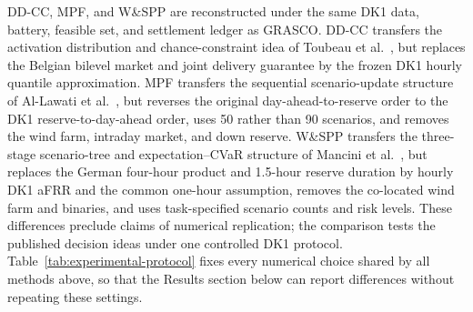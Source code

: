 \documentclass[11pt,a4paper]{article}
\begin{document}
DD-CC, MPF, and W\&SPP are reconstructed under the same DK1 data, battery,
feasible set, and settlement ledger as GRASCO.  DD-CC transfers the activation
distribution and chance-constraint idea of Toubeau et al.~\cite{toubeau2021},
but replaces the Belgian bilevel market and joint delivery guarantee by the
frozen DK1 hourly quantile approximation.  MPF transfers the sequential
scenario-update structure of Al-Lawati et al.~\cite{allawati2021}, but reverses
the original day-ahead-to-reserve order to the DK1 reserve-to-day-ahead order,
uses 50 rather than 90 scenarios, and removes the wind farm, intraday market,
and down reserve.  W\&SPP transfers the three-stage scenario-tree and
expectation--CVaR structure of Mancini et al.~\cite{mancini2024}, but replaces
the German four-hour product and 1.5-hour reserve duration by hourly DK1 aFRR
and the common one-hour assumption, removes the co-located wind farm and
binaries, and uses task-specified scenario counts and risk levels.  These
differences preclude claims of numerical replication; the comparison tests the
published decision ideas under one controlled DK1 protocol.
Table~\ref{tab:experimental-protocol} fixes every numerical choice shared by
all methods above, so that the Results section below can report differences
without repeating these settings.
\end{document}
